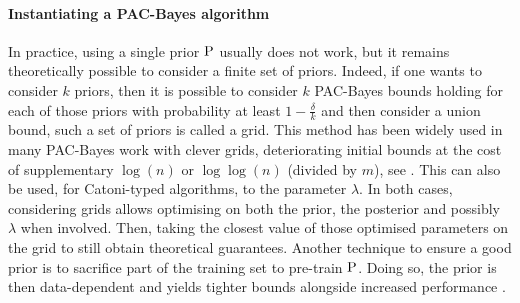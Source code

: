 \paragraph{Instantiating a PAC-Bayes algorithm}
  In practice, using a single prior $\P$ usually does not work, but it remains theoretically possible to consider a finite set of priors. Indeed, if one wants to consider $k$ priors, then it is possible to consider $k$ PAC-Bayes bounds holding for each of those priors with probability at least $1-\frac{\delta}{k}$ and then consider a union bound, such a set of priors is called a grid. This method has been widely used in many PAC-Bayes work with clever grids, deteriorating initial bounds at the cost of supplementary $\log(n)$ or $\log\log(n)$ (divided by $m$), see \eg \citet{alquier2024user}. 
  This can also be used, for Catoni-typed algorithms, to the parameter $\lambda$. In both cases, considering grids allows optimising on both the prior, the posterior and possibly $\lambda$ when involved. Then, taking the closest value of those optimised parameters on the grid to still obtain theoretical guarantees. Another technique to ensure a good prior is to sacrifice part of the training set to pre-train $\P$. 
  Doing so, the prior is then data-dependent and yields tighter bounds alongside increased performance \citep{perez2021tighter,perezortiz2021learning}.

